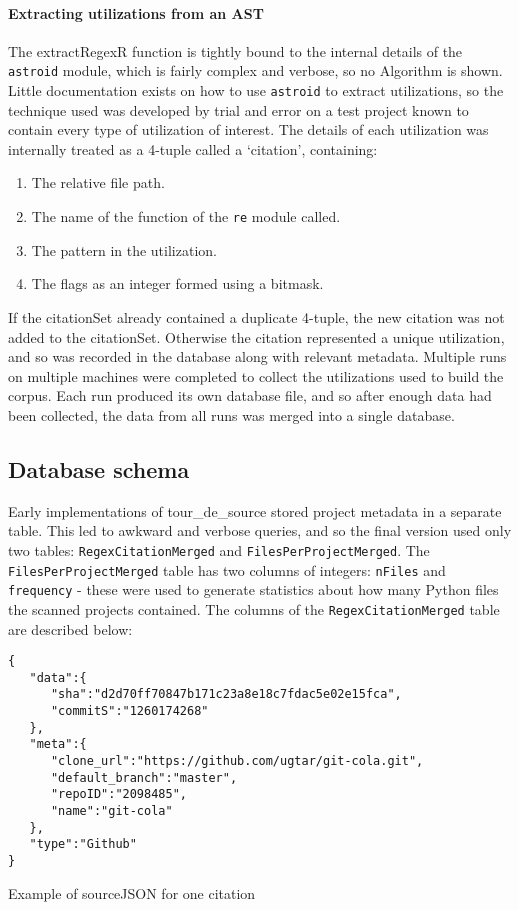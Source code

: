 \paragraph{Extracting utilizations from an AST}  The extractRegexR function is tightly bound to the internal details of the {\tt astroid} module, which is fairly complex and verbose, so no Algorithm is shown.  Little documentation exists on how to use {\tt astroid} to extract utilizations, so the technique used was developed by trial and error on a test project known to contain every type of utilization of interest.  The details of each utilization was internally treated as a 4-tuple called a `citation', containing:
\begin{enumerate} \itemsep -1pt
\item The relative file path.
\item The name of the function of the {\tt re} module called.
\item The pattern in the utilization.
\item The flags as an integer formed using a bitmask.
\end{enumerate}
If the citationSet already contained a duplicate 4-tuple, the new citation was not added to the citationSet.  Otherwise the citation represented a unique utilization, and so was recorded in the database along with relevant metadata.  Multiple runs on multiple machines were completed to collect the utilizations used to build the corpus.  Each run produced its own database file, and so after enough data had been collected, the data from all runs was merged into a single database.

\subsection*{Database schema}
Early implementations of tour\_de\_source stored project metadata in a separate table.  This led to awkward and verbose queries, and so the final version used only two tables: {\tt RegexCitationMerged} and {\tt FilesPerProjectMerged}.  The {\tt FilesPerProjectMerged} table has two columns of integers: {\tt nFiles} and {\tt frequency} - these were used to generate statistics about how many Python files the scanned projects contained.  The columns of the {\tt RegexCitationMerged} table are described below:


\begin{listing}[tb]
\begin{verbatim}
{
   "data":{
      "sha":"d2d70ff70847b171c23a8e18c7fdac5e02e15fca",
      "commitS":"1260174268"
   },
   "meta":{
      "clone_url":"https://github.com/ugtar/git-cola.git",
      "default_branch":"master",
      "repoID":"2098485",
      "name":"git-cola"
   },
   "type":"Github"
}
\end{verbatim}
\caption{Example of sourceJSON for one citation}
\label{list:exampleSourceJSON}
\end{listing}

